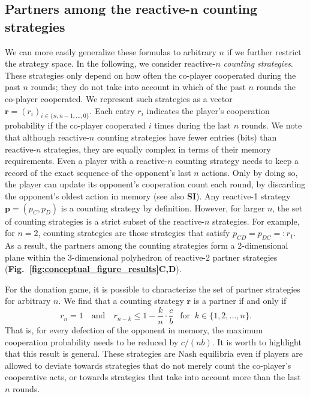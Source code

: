 \documentclass[9pt,twocolumn,twoside]{pnas-new}
\newcommand{\figref}[1]{{\textbf{Fig.~\ref{#1}}}}
\def\SI{\textbf{SI}}
\begin{document}

\noindent
\subsection*{Partners among the reactive-$\boldsymbol n$ counting strategies}
We can more easily generalize these formulas to arbitrary $n$ if we further restrict the strategy space. 
In the following, we consider reactive-$n$ {\it counting strategies}. 
These strategies only depend on how often the co-player cooperated during the past $n$ rounds; 
they do not take into account  in which of the past $n$ rounds the co-player cooperated. 
We represent such strategies as a vector $\mathbf{r}\!=\!(r_i)_{i \in \{n, n -1, \dots, 0\}}$. 
Each entry \(r_i\) indicates the player's cooperation probability if the co-player cooperated \(i\) times during the last \(n\) rounds. 
We note that although reactive-$n$ counting strategies have fewer entries (bits) than reactive-$n$ strategies, they are equally complex  in terms of their memory requirements. 
Even a player with a reactive-$n$ counting strategy needs to keep a record of the exact sequence of the opponent's last $n$ actions. 
Only by doing so, the player can update its opponent's cooperation count each round, by discarding the opponent's oldest action in memory (see also \SI). 
Any reactive-1 strategy $\mathbf{p}\!=\!(p_{C}, p_{D})$ is a counting strategy by definition. 
However, for larger $n$, the set of counting strategies is a strict subset of the reactive-$n$ strategies.
For example, for $n\!=\!2$, counting strategies are those strategies that satisfy $p_{CD}\!=\!p_{DC}\!=:\!r_1$. 
As a result, the partners among the counting strategies form a 2-dimensional plane within the 3-dimensional polyhedron of reactive-2 partner strategies (\figref{fig:conceptual_figure_results}\textbf{C,D}).

For the donation game, it is possible to characterize the set of partner strategies for arbitrary $n$. We find that a counting strategy $\mathbf{r}$ is a partner if and only if
\begin{equation} \label{eq:counting}
r_n = 1 \quad \text{and} \quad r_{n - k} \le 1\! -\! \frac{k}{n} \!\cdot\! \frac{c}{b}~~ \text{ for }~k \!\in\! \{1, 2, \dots, n\}.
\end{equation}
That is, for every defection of the opponent in memory, the maximum cooperation probability needs to be reduced by $c/(nb)$.
It is worth to highlight that this result is general. 
These strategies are Nash equilibria even if players are allowed to deviate towards strategies that do not merely count the co-player's cooperative acts, or towards strategies that take into account more than the last $n$ rounds.
\end{document}
